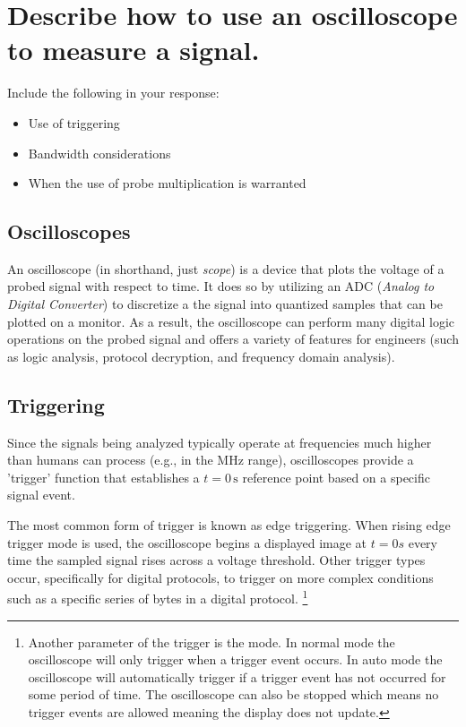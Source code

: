 \documentclass[main.tex]{subfiles}
\begin{document}
\section{Describe how to use an oscilloscope to measure a signal.}

Include the following in your response:
\begin {itemize}
    \item Use of triggering
    \item Bandwidth considerations
    \item When the use of probe multiplication is warranted
\end {itemize}

\spoilerline

\subsection{Oscilloscopes}
An oscilloscope (in shorthand, just \textit{scope}) is a device that plots the voltage of a probed signal with respect to time. It does so by utilizing an ADC (\textit{Analog to Digital Converter}) to discretize a the signal into quantized samples that can be plotted on a monitor. As a result, the oscilloscope can perform many digital logic operations on the probed signal and offers a variety of features for engineers (such as logic analysis, protocol decryption, and frequency domain analysis).

\subsection{Triggering}
Since the signals being analyzed typically operate at frequencies much higher than humans can process (e.g., in the MHz range), oscilloscopes provide a 'trigger' function that establishes a \( t = 0 \, \text{s} \) reference point based on a specific signal event. \newline

\newnoindentpara The most common form of trigger is known as edge triggering. When rising edge trigger mode is used, the oscilloscope begins a displayed image at $t=0s$ every time the sampled signal rises across a voltage threshold. Other trigger types occur, specifically for digital protocols, to trigger on more complex conditions such as a specific series of bytes in a digital protocol. \footnote{Another parameter of the trigger is the mode. In normal mode the oscilloscope will only trigger when a trigger event occurs. In auto mode the oscilloscope will automatically trigger if a trigger event has not occurred for some period of time. The oscilloscope can also be stopped which means no trigger events are allowed meaning the display does not update.} %
\end{document}
